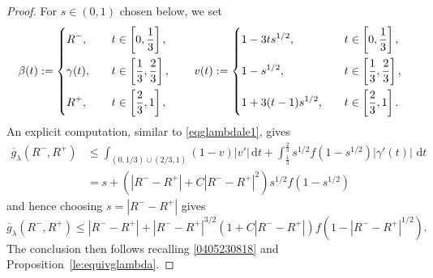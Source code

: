 \documentclass[a4paper,reqno]{amsart}
\newcommand\dt{{\,\mathrm{d}t}}
\theoremstyle{remark}
\newcommand{\ol}{\overline}
\numberwithin{equation}{section}
\begin{document}
\begin{proof}
For $s\in (0,1)$ chosen below, we set
\begin{equation*}
	\beta(t):=\begin{dcases}
		 R^-, \quad & t\in \left[0, \frac13\right],\\
		\gamma(t),\quad & t\in \left[\frac13, \frac23\right],\\
		 R^+, \quad & t\in \left[\frac23,1\right],
	\end{dcases} \qquad
	v(t):=\begin{dcases}
		1-3t s^{1/2}, \quad & t\in \left[0, \frac13\right],\\
		1- s^{1/2}, \quad & t\in \left[\frac13, \frac23\right],\\
		1 + 3 (t-1)  s^{1/2}, \quad & t\in \left[\frac23,1\right].
	\end{dcases}
\end{equation*}
An explicit computation, similar to \eqref{eqglambdale1}, gives
\[
\begin{split}
	\ol g_\lambda( R^-,  R^+)  & \leq \int_{(0,1/3)\cup(2/3,1)}(1-v) |v'| 
	\dt + \int_\frac13^\frac23 s^{1/2} f(1- s^{1/2}) |\gamma'(t)|\, \dt
	\\  
	& =
	s +(|R^--  R^+|+C|R^--  R^+|^2) s^{1/2} f(1-s^{1/2})
\end{split}
\]
and hence choosing $s=|R^--  R^+|$ gives
\begin{equation}\label{1902241215}
	\ol	g_\lambda( R^-,R^+) \leq  | R^- - R^+| +|R^--  R^+|^{3/2}(1+C|R^--  R^+|)  f(1-| R^- - R^+|^{1/2}) .
\end{equation}
The conclusion then follows recalling  
\eqref{0405230818}
and Proposition~\ref{le:equivglambda}.


\smallskip


\end{proof}
\end{document}
